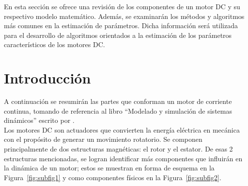 En esta sección se ofrece una revisión de los componentes de un motor \ac{DC} y su respectivo modelo matemático. Además, se examinarán los métodos y algoritmos más comunes en la estimación de parámetros. Dicha información será utilizada para el desarrollo de algoritmos orientados a la estimación de los parámetros característicos de los motores \ac{DC}.
    \section{Introducción}
    \label{sec:CH02_INTRODUCCION}
    A continuación se resumirán las partes que conforman un motor de corriente continua, tomando de referencia al libro ``Modelado y simulación de sistemas dinámicos'' escrito por \textcite{libro_aleman}.\\
    Los motores \ac{DC} son actuadores que convierten la energía eléctrica en mecánica con el propósito de generar un movimiento rotatorio. Se componen principalmente de dos estructuras magnéticas: el rotor y el estator. De esas 2 estructuras mencionadas, se logran identificar más componentes que influirán en la dinámica de un motor; estos se muestran en forma de esquema en la Figura~\ref{fig:subfig1} y como componentes físicos en la Figura~\ref{fig:subfig2}. 
